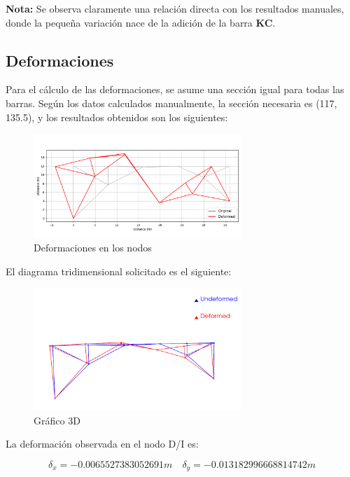 \textbf{Nota:} Se observa claramente una relación directa con los resultados manuales, donde la pequeña variación nace de la adición de la barra \textbf{KC}.

\subsection{Deformaciones}

Para el cálculo de las deformaciones, se asume una sección igual para todas las barras. Según los datos calculados manualmente, la sección necesaria es (117, 135.5), y los resultados obtenidos son los siguientes:

\begin{figure}[H]
    \centering
    \includegraphics[width=0.7\textwidth]{GRAFICOS/deformed_truss.png}
    \caption{Deformaciones en los nodos}
    \label{fig:deformaciones}
\end{figure}

El diagrama tridimensional solicitado es el siguiente:

\begin{figure}[H]
    \centering
    \includegraphics[width=0.7\textwidth]{GRAFICOS/3D.png}
    \caption{Gráfico 3D}
    \label{fig:deformaciones_3D}
\end{figure}

La deformación observada en el nodo D/I es:

\begin{equation}
    \delta_x = -0.0065527383052691 m \quad \delta_y = -0.013182996668814742 m
\end{equation}

